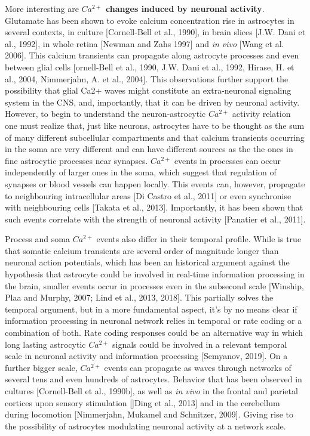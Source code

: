 More interesting are \textbf{$Ca^{2+}$ changes induced by neuronal activity}.
Glutamate has been shown to evoke calcium concentration rise in astrocytes in several contexts, in culture [Cornell-Bell et al., 1990], in brain slices [J.W. Dani et al., 1992], in whole retina [Newman and Zahs 1997] and \textit{in vivo} [Wang et al. 2006].
This calcium transients can propagate along astrocyte processes and even between glial cells [ornell-Bell et al., 1990, J.W. Dani et al., 1992, Hirase, H. et al., 2004, Nimmerjahn, A. et al., 2004].
This observations further support the possibility that glial Ca2+ waves might constitute an extra-neuronal signaling system in the CNS, and, importantly, that it can be driven by neuronal activity. 
However, to begin to understand the neuron-astrocytic $Ca^{2+}$ activity relation one must realize that, just like neurons, astrocytes have to be thought as the sum of many different subcellular compartments and that calcium transients occurring in the soma are very different and can have different sources as the the ones in fine astrocytic processes near synapses.
$Ca^{2+}$ events in processes can occur independently of larger ones in the soma, which suggest that regulation of synapses or blood vessels can happen locally. 
This events can, however, propagate to neighbouring intracellular areas [Di Castro et al., 2011] or even synchronise with neighbouring cells [Takata et al., 2013].
Importantly, it has been shown that such events correlate with the strength of neuronal activity [Panatier et al., 2011].

Process and soma $Ca^{2+}$ events also differ in their temporal profile.
While is true that somatic calcium transients are several order of magnitude longer than neuronal action potentials, which has been an historical argument against the hypothesis that astrocyte could be involved in real-time information processing in the brain, smaller events occur in processes even in the subsecond scale [Winship, Plaa and Murphy, 2007; Lind et al., 2013, 2018].
This partially solves the temporal argument, but in a more fundamental aspect, it's by no means clear if information processing in neuronal network relies in temporal or rate coding or a combination of both.
Rate coding responses could be an alternative way in which long lasting astrocytic $Ca^{2+}$ signals could be involved in a relevant temporal scale in neuronal activity and information processing [Semyanov, 2019].
On a further bigger scale, $Ca^{2+}$ events can propagate as waves through networks of several tens and even hundreds of astrocytes.
Behavior that  has been observed in cultures [Cornell-Bell et al., 1990b], as well as \textit{in vivo} in the frontal and parietal cortices upon sensory stimulation []Ding et al., 2013] and in the cerebellum during locomotion [Nimmerjahn, Mukamel and Schnitzer, 2009].
Giving rise to the possibility of astrocytes modulating neuronal activity at a network scale. 

